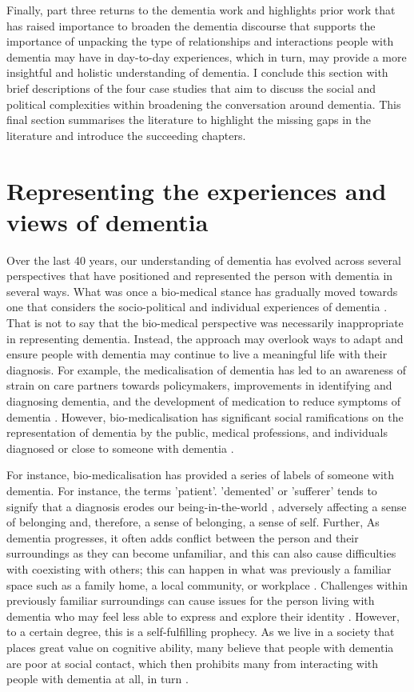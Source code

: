 Finally, part three returns to the dementia work and highlights prior work that has raised importance to broaden the dementia discourse that supports the importance of unpacking the type of relationships and interactions people with dementia may have in day-to-day experiences, which in turn, may provide a more insightful and holistic understanding of dementia. I conclude this section with brief descriptions of the four case studies that aim to discuss the social and political complexities within broadening the conversation around dementia. This final section summarises the literature to highlight the missing gaps in the literature and introduce the succeeding chapters.

\section{Representing the experiences and views of dementia}
\label{BL:partOne}
Over the last 40 years, our understanding of dementia has evolved across several perspectives that have positioned and represented the person with dementia in several ways. What was once a bio-medical stance has gradually moved towards one that considers the socio-political and individual experiences of dementia \citep{bellass_broadening_2019}. That is not to say that the bio-medical perspective was necessarily inappropriate in representing dementia. Instead, the approach may overlook ways to adapt and ensure people with dementia may continue to live a meaningful life with their diagnosis. For example, the medicalisation of dementia has led to an awareness of strain on care partners towards policymakers, improvements in identifying and diagnosing dementia, and the development of medication to reduce symptoms of dementia \citep{doi:10.1080/13607863.2019.1693968}. However, bio-medicalisation has significant social ramifications on the representation of dementia by the public, medical professions, and individuals diagnosed or close to someone with dementia \citep{lyman_bringing_1989}.

For instance, bio-medicalisation has provided a series of labels  of someone with dementia. For instance, the terms 'patient'. 'demented' or 'sufferer' tends to signify that a diagnosis erodes our being-in-the-world \citep{hampson_dementia:_2016}, adversely affecting a sense of belonging and, therefore, a sense of belonging, a sense of self. Further, As dementia progresses, it often adds conflict between the person and their surroundings as they can become unfamiliar, and this can also cause difficulties with coexisting with others; this can happen in what was previously a familiar space such as a family home, a local community, or workplace \citep{langdon_making_2007,au_social_2009}. Challenges within previously familiar surroundings can cause issues for the person living with dementia who may feel less able to express and explore their identity \citep{john_killick_claire_craig_creativity_2012,kontos_embodied_2005}. However, to a certain degree, this is a self-fulfilling prophecy. As we live in a society that places great value on cognitive ability, many believe that people with dementia are poor at social contact, which then prohibits many from interacting with people with dementia at all, in turn \citep{killick_communication_2001}. 

